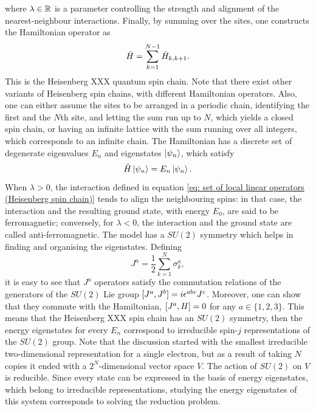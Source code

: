 where $\lambda \in \mathbb{R}$ is a parameter controlling the strength and alignment of the nearest-neighbour interactions. Finally, by summing over the sites, one constructs the Hamiltonian operator as
\begin{equation}
    \hat{H} = \sum_{k=1}^{N-1}\hat{H}_{k,k + 1}.
\end{equation}
This is the Heisenberg XXX quantum spin chain. Note that there exist other variants of Heisenberg spin chains, with different Hamiltonian operators. Also, one can either assume the sites to be arranged in a periodic chain, identifying the first and the $N$th site, and letting the sum run up to $N$, which yields a closed spin chain, or having an infinite lattice with the sum running over all integers, which corresponds to an infinite chain. The Hamiltonian has a discrete set of degenerate eigenvalues $E_n$ and eigenstates $\ket{\psi_n}$, which satisfy 
\begin{equation}
    \hat{H}\ket{\psi_n} = E_n\ket{\psi_n}.
\end{equation}
When $\lambda > 0$, the interaction defined in equation \eqref{eq: set of local linear operators (Heisenberg spin chain)} tends to align the neighbouring spins: in that case, the interaction and the resulting ground state, with energy $E_0$, are said to be ferromagnetic; conversely, for $\lambda < 0$, the interaction and the ground state are called anti-ferromagnetic. The model has a $SU(2)$ symmetry which helps in finding and organising the eigenstates. Defining
\begin{equation}
    J^a = \frac{1}{2}\sum_{k=1}^N\sigma^a_k,
\end{equation}
it is easy to see that $J^a$ operators satisfy the commutation relations of the generators of the $SU(2)$ Lie group $[J^a,J^b] = i\epsilon^{abc}J^c$. Moreover, one can show that they commute with the Hamiltonian, $[J^a,H] = 0$ for any $a \in \{1,2,3\}$. This means that the Heisenberg XXX spin chain has an $SU(2)$ symmetry, then the energy eigenstates for every $E_n$ correspond to irreducible spin-$j$ representations of the $SU(2)$ group. Note that the discussion started with the smallest irreducible two-dimensional representation for a single electron, but as a result of taking $N$ copies it ended with a $2^N$-dimensional vector space $V$. The action of $SU(2)$ on $V$ is reducible. Since every state can be expressed in the basis of energy eigenstates, which belong to irreducible representations, studying the energy eigenstates of this system corresponds to solving the reduction problem.
